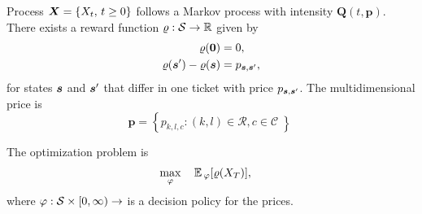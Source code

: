 Process $\bm{X} = \{ X_t ,\, t \geq 0 \}$ follows a Markov process with intensity $\bm{Q} (t, \bm{p})$. There exists a reward function $\varrho: \mathcal{S} \to \mathbb{R}$ given by
\begin{align*}
	\varrho (\bm{0}) &= 0, \\
	\varrho (\bm{s}') - \varrho (\bm{s}) &= p_{\bm{s}, \bm{s}'},
\end{align*}
for states $\bm{s}$ and $\bm{s}'$ that differ in one ticket with price $p_{\bm{s}, \bm{s}'}$. The multidimensional price is
\[
	\bm{p} = \left\{ p_{k,l,c}: (k,l) \in \mathcal{R}, c \in \mathcal{C} \left\}
\]


The optimization problem is
\begin{equation*}
	\begin{aligned}
		& \underset{\varphi}{\max} & & \operatorname{\mathbb{E}\,}_{\varphi} [\varrho(X_T)],
	\end{aligned}
\end{equation*}
where $\varphi: \mathcal{S} \times [0, \infty) \to $ is a decision policy for the prices.
